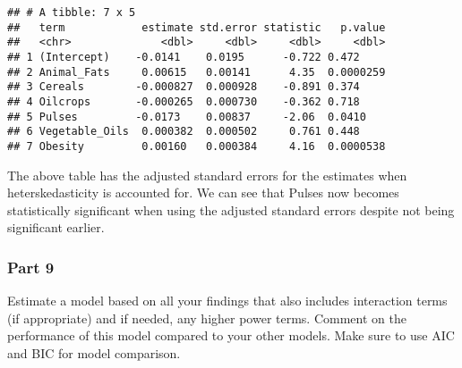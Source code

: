 \documentclass[
]{article}
\begin{document}
\begin{verbatim}
## # A tibble: 7 x 5
##   term            estimate std.error statistic   p.value
##   <chr>              <dbl>     <dbl>     <dbl>     <dbl>
## 1 (Intercept)    -0.0141    0.0195      -0.722 0.472    
## 2 Animal_Fats     0.00615   0.00141      4.35  0.0000259
## 3 Cereals        -0.000827  0.000928    -0.891 0.374    
## 4 Oilcrops       -0.000265  0.000730    -0.362 0.718    
## 5 Pulses         -0.0173    0.00837     -2.06  0.0410   
## 6 Vegetable_Oils  0.000382  0.000502     0.761 0.448    
## 7 Obesity         0.00160   0.000384     4.16  0.0000538
\end{verbatim}

The above table has the adjusted standard errors for the estimates when
heterskedasticity is accounted for. We can see that Pulses now becomes
statistically significant when using the adjusted standard errors
despite not being significant earlier.

\hypertarget{part-9}{%
\subsubsection{Part 9}\label{part-9}}

Estimate a model based on all your findings that also includes
interaction terms (if appropriate) and if needed, any higher power
terms. Comment on the performance of this model compared to your other
models. Make sure to use AIC and BIC for model comparison.
\end{document}
